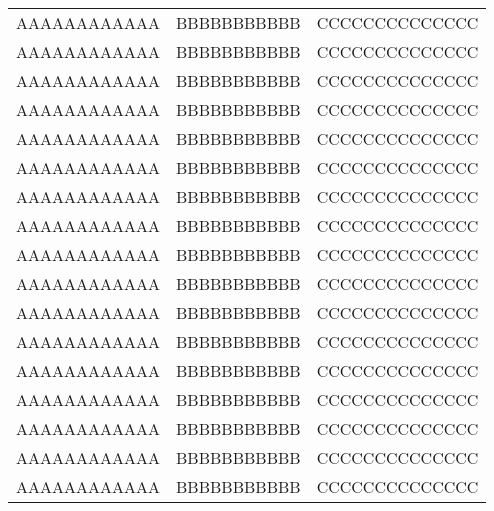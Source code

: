 \begin{longtable}{ccc}
AAAAAAAAAAAA   &   BBBBBBBBBBB   &   CCCCCCCCCCCCCC   \\
AAAAAAAAAAAA   &   BBBBBBBBBBB   &   CCCCCCCCCCCCCC   \\
AAAAAAAAAAAA   &   BBBBBBBBBBB   &   CCCCCCCCCCCCCC   \\
AAAAAAAAAAAA   &   BBBBBBBBBBB   &   CCCCCCCCCCCCCC   \\
AAAAAAAAAAAA   &   BBBBBBBBBBB   &   CCCCCCCCCCCCCC   \\
AAAAAAAAAAAA   &   BBBBBBBBBBB   &   CCCCCCCCCCCCCC   \\
AAAAAAAAAAAA   &   BBBBBBBBBBB   &   CCCCCCCCCCCCCC   \\
AAAAAAAAAAAA   &   BBBBBBBBBBB   &   CCCCCCCCCCCCCC   \\
AAAAAAAAAAAA   &   BBBBBBBBBBB   &   CCCCCCCCCCCCCC   \\
AAAAAAAAAAAA   &   BBBBBBBBBBB   &   CCCCCCCCCCCCCC   \\
AAAAAAAAAAAA   &   BBBBBBBBBBB   &   CCCCCCCCCCCCCC   \\
AAAAAAAAAAAA   &   BBBBBBBBBBB   &   CCCCCCCCCCCCCC   \\
AAAAAAAAAAAA   &   BBBBBBBBBBB   &   CCCCCCCCCCCCCC   \\
AAAAAAAAAAAA   &   BBBBBBBBBBB   &   CCCCCCCCCCCCCC   \\
AAAAAAAAAAAA   &   BBBBBBBBBBB   &   CCCCCCCCCCCCCC   \\
AAAAAAAAAAAA   &   BBBBBBBBBBB   &   CCCCCCCCCCCCCC   \\
AAAAAAAAAAAA   &   BBBBBBBBBBB   &   CCCCCCCCCCCCCC   \\
\end{longtable}

